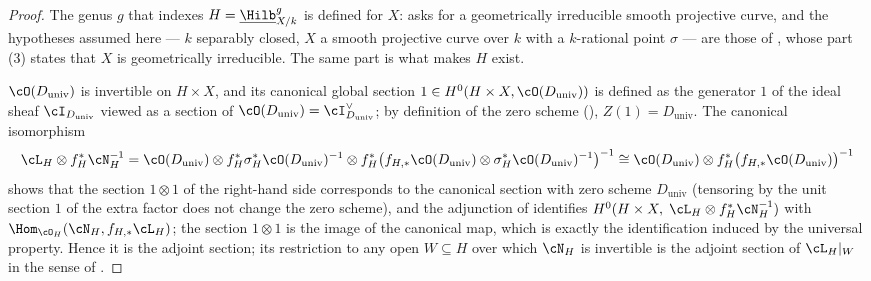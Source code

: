 \begin{proof}
The genus $g$ that indexes $H=\underline{\Hilb}^g_{X/k}$ is defined for
$X$:  asks for a geometrically irreducible smooth
projective curve, and the hypotheses assumed here --- $k$ separably
closed, $X$ a smooth projective curve over $k$ with a $k$-rational point
$\sigma$ --- are those of , whose part (3)
states that $X$ is geometrically irreducible.  The same part is what
makes $H$ exist.

$\cO(D_{\mathrm{univ}})$ is invertible on $H\times X$, and its canonical
global section $1\in H^0(H\times X,\cO(D_{\mathrm{univ}}))$ is defined as
the generator $1$ of the ideal sheaf $\cI_{D_{\mathrm{univ}}}$ viewed as a
section of $\cO(D_{\mathrm{univ}})=\cI_{D_{\mathrm{univ}}}^\vee$; by
definition of the zero scheme
(), $Z(1)=D_{\mathrm{univ}}$.  The canonical
isomorphism
\[
\cL_H\otimes f_H^*\cN_H^{-1}
=\cO(D_{\mathrm{univ}})\otimes f_H^*\sigma_H^*\cO(D_{\mathrm{univ}})^{-1}
 \otimes f_H^*\bigl(f_{H,*}\cO(D_{\mathrm{univ}})\otimes
\sigma_H^*\cO(D_{\mathrm{univ}})^{-1}\bigr)^{-1}
\cong\cO(D_{\mathrm{univ}})\otimes f_H^*\bigl(f_{H,*}\cO(D_{\mathrm{univ}})\bigr)^{-1}
\]
shows that the section $1\otimes 1$ of the right-hand side corresponds to
the canonical section with zero scheme $D_{\mathrm{univ}}$ (tensoring by
the unit section $1$ of the extra factor does not change the zero
scheme), and the adjunction of  identifies
$H^0(H\times X,\;\cL_H\otimes f_H^*\cN_H^{-1})$ with
$\Hom_{\cO_H}(\cN_H,f_{H,*}\cL_H)$; the section $1\otimes 1$ is the image
of the canonical map, which is exactly the identification induced by the
universal property.  Hence it is the adjoint section; its restriction to
any open $W\subseteq H$ over which $\cN_H$ is invertible is the adjoint
section of $\cL_H|_W$ in the sense of .
\end{proof}

